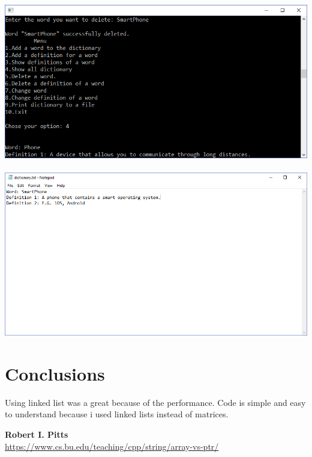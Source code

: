 \documentclass{article}
\begin{document}
\includegraphics[scale=1]{e4} \\ \\
\includegraphics[scale=1]{e5}

\pagebreak

\section{Conclusions}
\textbf{}
\indent Using linked list was a great because of the performance. Code is simple and easy to understand because i used linked lists instead of matrices.


\begin{thebibliography}{9}

     {\bf Robert I. Pitts} \\
     \url{https://www.cs.bu.edu/teaching/cpp/string/array-vs-ptr/}


\end{thebibliography}
\end{document}
